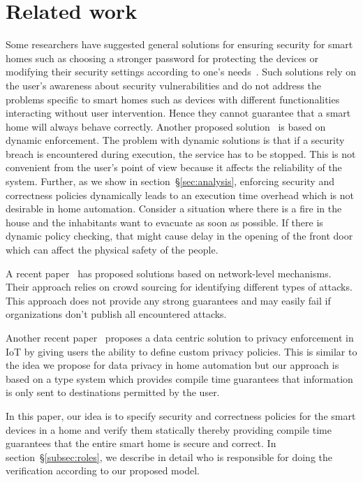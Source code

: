 \documentclass{article}
\begin{document}
\section{Related work}
Some researchers have suggested general solutions for ensuring security for smart homes such as choosing a stronger password for protecting the devices or modifying their security settings according to one's needs~\cite{semantec}. Such solutions rely on the user's awareness about security vulnerabilities and do not address the problems specific to smart homes such as devices with different functionalities interacting without user intervention. Hence they cannot guarantee that a smart home will always behave correctly. Another proposed solution~\cite{al2000secure} is based on dynamic enforcement. The problem with dynamic solutions is that if a security breach is encountered during execution, the service has to be stopped. This is not convenient from the user's point of view because it affects the reliability of the system. Further, as we show in section~\S\ref{sec:analysis}, enforcing security and correctness policies dynamically leads to an execution time overhead which is not desirable in home automation. Consider a situation where there is a fire in the house and the inhabitants want to evacuate as soon as possible. If there is dynamic policy checking, that might cause delay in the opening of the front door which can affect the physical safety of the people. 

A recent paper~\cite{trillions} has proposed solutions based on network-level mechanisms. Their approach relies on crowd sourcing for identifying different types of attacks. This approach does not provide any strong guarantees and may easily fail if organizations don't publish all encountered attacks. 

Another recent paper~\cite{googleIoT} proposes a data centric solution to privacy enforcement in IoT by giving users the ability to define custom privacy policies. This is similar to the idea we propose for data privacy in home automation but our approach is based on a type system which provides compile time guarantees that information is only sent to destinations permitted by the user. 


In this paper, our idea is to specify security and correctness policies for the smart devices in a home and verify them statically thereby providing compile time guarantees that the entire smart home is secure and correct. In section~\S\ref{subsec:roles}, we describe in detail who is responsible for doing the verification according to our proposed model.
\end{document}
